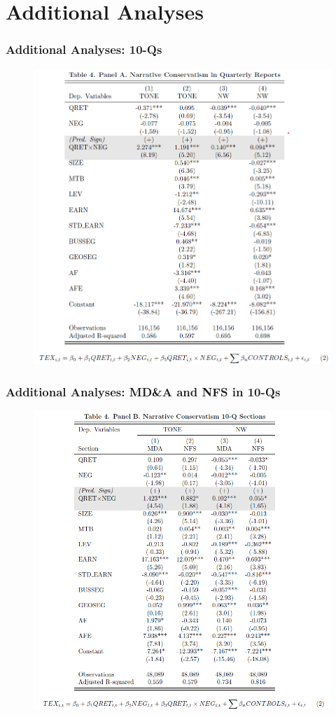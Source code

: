 \documentclass{beamer}
\begin{document}
\section{Additional Analyses}
\begin{frame}
	\frametitle{Additional Analyses: 10-Qs}
	\begin{figure}[h]
		\centering
		\includegraphics[width=0.6\linewidth]{tab4panA}
		\label{tab4panA}
	\end{figure}
\end{frame}
\begin{frame}
\frametitle{Additional Analyses: MD\&A and NFS in 10-Qs}
	\begin{figure}[h]
	\centering
	\includegraphics[width=0.58\linewidth]{tab4panB}
	\label{tab4panB}
	\end{figure}
\end{frame}
\end{document}
